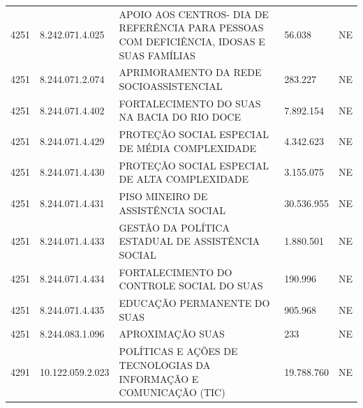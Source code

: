 \documentclass{article}
\begin{document}
\begin{longtable}[c]{m{1cm}|m{2cm}|m{10cm}|m{2cm}|m{1cm}}
\multicolumn{1}{C{1cm}|}{4251} & \multicolumn{1}{C{2cm}|}{8.242.071.4.025} & \multicolumn{1}{L{10cm}|}{APOIO AOS CENTROS- DIA DE REFERÊNCIA PARA PESSOAS COM DEFICIÊNCIA, IDOSAS E SUAS FAMÍLIAS} & \multicolumn{1}{R{2cm}|}{56.038} & \multicolumn{1}{C{1cm}}{NE} \\
\multicolumn{1}{C{1cm}|}{4251} & \multicolumn{1}{C{2cm}|}{8.244.071.2.074} & \multicolumn{1}{L{10cm}|}{APRIMORAMENTO DA REDE SOCIOASSISTENCIAL} & \multicolumn{1}{R{2cm}|}{283.227} & \multicolumn{1}{C{1cm}}{NE} \\
\multicolumn{1}{C{1cm}|}{4251} & \multicolumn{1}{C{2cm}|}{8.244.071.4.402} & \multicolumn{1}{L{10cm}|}{FORTALECIMENTO DO SUAS NA BACIA DO RIO DOCE} & \multicolumn{1}{R{2cm}|}{7.892.154} & \multicolumn{1}{C{1cm}}{NE} \\
\multicolumn{1}{C{1cm}|}{4251} & \multicolumn{1}{C{2cm}|}{8.244.071.4.429} & \multicolumn{1}{L{10cm}|}{PROTEÇÃO SOCIAL ESPECIAL DE MÉDIA COMPLEXIDADE} & \multicolumn{1}{R{2cm}|}{4.342.623} & \multicolumn{1}{C{1cm}}{NE} \\
\multicolumn{1}{C{1cm}|}{4251} & \multicolumn{1}{C{2cm}|}{8.244.071.4.430} & \multicolumn{1}{L{10cm}|}{PROTEÇÃO SOCIAL ESPECIAL DE ALTA COMPLEXIDADE} & \multicolumn{1}{R{2cm}|}{3.155.075} & \multicolumn{1}{C{1cm}}{NE} \\
\multicolumn{1}{C{1cm}|}{4251} & \multicolumn{1}{C{2cm}|}{8.244.071.4.431} & \multicolumn{1}{L{10cm}|}{PISO MINEIRO DE ASSISTÊNCIA SOCIAL} & \multicolumn{1}{R{2cm}|}{30.536.955} & \multicolumn{1}{C{1cm}}{NE} \\
\multicolumn{1}{C{1cm}|}{4251} & \multicolumn{1}{C{2cm}|}{8.244.071.4.433} & \multicolumn{1}{L{10cm}|}{GESTÃO DA POLÍTICA ESTADUAL DE ASSISTÊNCIA SOCIAL} & \multicolumn{1}{R{2cm}|}{1.880.501} & \multicolumn{1}{C{1cm}}{NE} \\
\multicolumn{1}{C{1cm}|}{4251} & \multicolumn{1}{C{2cm}|}{8.244.071.4.434} & \multicolumn{1}{L{10cm}|}{FORTALECIMENTO DO CONTROLE SOCIAL DO SUAS} & \multicolumn{1}{R{2cm}|}{190.996} & \multicolumn{1}{C{1cm}}{NE} \\
\multicolumn{1}{C{1cm}|}{4251} & \multicolumn{1}{C{2cm}|}{8.244.071.4.435} & \multicolumn{1}{L{10cm}|}{EDUCAÇÃO PERMANENTE DO SUAS} & \multicolumn{1}{R{2cm}|}{905.968} & \multicolumn{1}{C{1cm}}{NE} \\
\multicolumn{1}{C{1cm}|}{4251} & \multicolumn{1}{C{2cm}|}{8.244.083.1.096} & \multicolumn{1}{L{10cm}|}{APROXIMAÇÃO SUAS} & \multicolumn{1}{R{2cm}|}{233} & \multicolumn{1}{C{1cm}}{NE} \\
\multicolumn{1}{C{1cm}|}{4291} & \multicolumn{1}{C{2cm}|}{10.122.059.2.023} & \multicolumn{1}{L{10cm}|}{POLÍTICAS E AÇÕES DE TECNOLOGIAS DA INFORMAÇÃO E COMUNICAÇÃO (TIC)} & \multicolumn{1}{R{2cm}|}{19.788.760} & \multicolumn{1}{C{1cm}}{NE} \\

\end{longtable}
\end{document}
